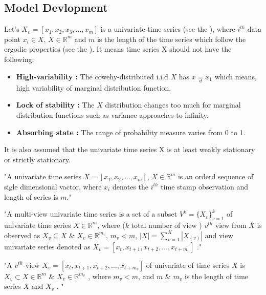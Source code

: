 \subsection{Model Devlopment}
Let's $X_v=[ x_1, x_2, x_3, \dots ,x_m]$ is a univariate time series (see the ),  where $i^{th}$ data point $x_i \in X$,  $X \in \mathbb{R}^m$ and $m$ is the length of the time series which follow the ergodic properties (see the ). It means time series X should not have the following: 

\begin{itemize}
  \item \textbf{High-variability : } The cowehy-distributed i.i.d $X $ has $\bar{x}\underset{d}{=} x_1$ which means,  high variability of marginal distribution function.
  \item \textbf{Lock of stability : } The $X$ distribution changes too much for marginal distribution functions such as variance approaches to infinity.
  \item \textbf{Absorbing state : } The range of probability measure varies from 0 to 1.
\end{itemize}
It is also assumed that the univariate time series X is at least weakly stationary or strictly stationary.


\begin{definition} \label{univts}
  "A univariate time series $X=[x_1, x_2, \dots, x_m]$,  $X\in \mathbb{R}^m$ is an orderd sequence of sigle dimensional vactor,  where $x_i$ denotes the $i^{th}$ time stamp observation and length of series is $m$."
\end{definition}

  \begin{definition}\label{mvts}
    "A multi-view univariate time series is a set of a subset $V^k= \{X_{v} \}_{v=1}^k$ of univariate time series $X\in \mathbb{R}^m$,  where ($k$ total number of view ) $v^{th}$ view from $X$ is observed as $X_v \subseteq X$ \& $X_v \in \mathbb{R}^{m_v}$,  $m_{v} < m$,  $\left|X  \right|= \sum_{v=1}^{K} \left| X_{(v)} \right|$ and view univariate series denoted as $X_v=[ x_t, x_{t+1}, x_{t+2}, \dots, x_{t+m_v} ]$ ."
  \end{definition} 

  \begin{definition}\label{v uts}
    "A $v^{th}$-view $X_v=[ x_t, x_{t+1}, x_{t+2}, \dots, x_{t+m_v} ]$ of univariate of time series $X$ is $X_v \subset X \in \mathbb{R}^{m}$ \& $X_v \in \mathbb{R}^{m_v}$ ,  where $m_{v} < m$,  and $m$ \& $m_v$ is the length of time series $X$ and $X_v$ . "
  \end{definition}

